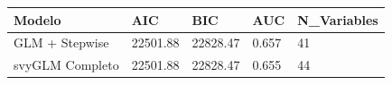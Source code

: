 \begin{tabular}{lllll}
  \toprule
Modelo & AIC & BIC & AUC & N\_Variables \\ 
  \midrule
GLM + Stepwise & 22501.88 & 22828.47 & 0.657 & 41 \\ 
  svyGLM Completo & 22501.88 & 22828.47 & 0.655 & 44 \\ 
   \bottomrule
\end{tabular}
